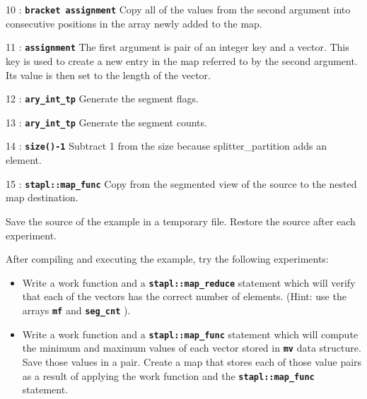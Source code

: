 \documentclass{report}
\begin{document}
\begin{hashitemize}
\item 10 : \texttt{{\bf bracket assignment}}
\newline
Copy all of the values from the second argument into consecutive positions in 
the array newly added to the map.

\item 11 : \texttt{{\bf assignment}}
\newline
The first argument is pair of an integer key and a vector. This key is used to
create a new entry in the map referred to by the second argument. Its
value is then set to the length of the vector.

\item 12 : \texttt{{\bf ary\_int\_tp}}
\newline
Generate the segment flags.

\item 13 : \texttt{{\bf ary\_int\_tp}}
\newline
Generate the segment counts.

\item 14 : \texttt{{\bf size()-1}}
\newline
Subtract 1 from the size because splitter\_partition adds an element.

\item 15 : \texttt{{\bf stapl::map\_func}}
\newline
Copy from the segmented view of the source to the nested map destination.

\end{hashitemize}

Save the source of the example in a temporary file.
Restore the source after each experiment.

After compiling and executing the example, try the following experiments:
\begin{itemize}
\item
Write a work function and a
\texttt{{\bf stapl::map\_reduce}}
statement
which will verify that each of the vectors has the correct number of elements.
(Hint: use the arrays
\texttt{{\bf mf}} and \texttt{{\bf seg\_cnt}} ).

\item
Write a work function and a
\texttt{{\bf stapl::map\_func}}
statement which will compute the minimum and maximum values
of each vector stored in
\texttt{{\bf mv}}
data structure.  Save those values in a pair.
Create a map that stores each of those value pairs as a result of
applying the work function and the
\texttt{{\bf stapl::map\_func}}
statement.

\end{itemize}
\end{document}
